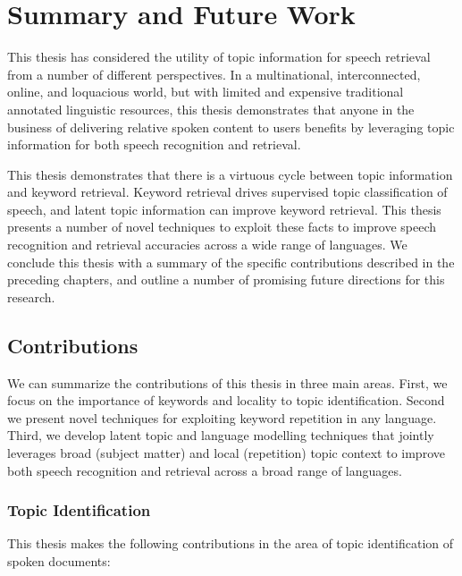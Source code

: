 \chapter{Summary and Future Work}
\label{sec:summary}

This thesis has considered the utility of topic information for speech retrieval from a number of different perspectives.  In a multinational, interconnected, online, and loquacious world, but with limited and expensive traditional annotated linguistic resources, this thesis demonstrates that anyone in the business of delivering relative spoken content to users benefits by leveraging topic information for both speech recognition and retrieval.

This thesis demonstrates that there is a virtuous cycle between topic information and keyword retrieval.  Keyword retrieval drives supervised topic classification of speech, and latent topic information can improve keyword retrieval.  This thesis presents a number of novel techniques to exploit these facts to improve speech recognition and retrieval accuracies across a wide range of languages.  We conclude this thesis with a summary of the specific contributions described in the preceding chapters, and outline a number of promising future directions for this research.



\section{Contributions}	

We can summarize the contributions of this thesis in three main areas.  First, we focus on the importance of keywords and locality to topic identification.   Second we present novel techniques for exploiting keyword repetition in any language.   Third, we develop latent topic and language modelling techniques that jointly leverages broad (subject matter) and local (repetition) topic context to improve both speech recognition and retrieval across a broad range of languages.

\subsection{Topic Identification}
This thesis makes the following contributions in the area of topic identification of spoken documents:

